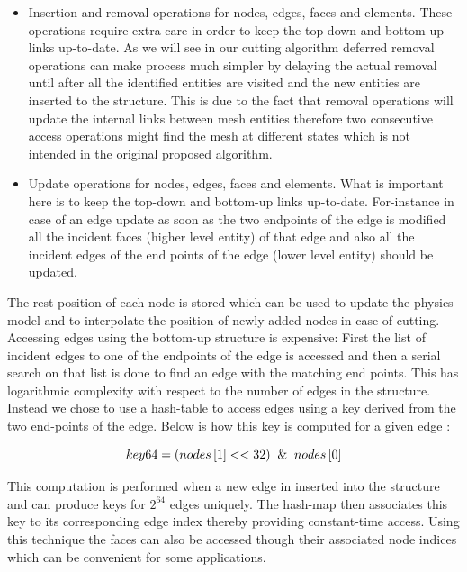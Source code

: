 \begin{itemize}
 \item Insertion and removal operations for nodes, edges, faces and elements. These operations require extra care in order to keep
 the top-down and bottom-up links up-to-date. As we will see in our cutting algorithm deferred removal operations can make process much simpler by
 delaying the actual removal until after all the identified entities are visited and the new entities are inserted to the structure.
 This is due to the fact that removal operations will update the internal links between mesh entities therefore two consecutive access operations
 might find the mesh at different states which is not intended in the original proposed algorithm.
 
 \item Update operations for nodes, edges, faces and elements. What is important here is to keep the top-down and bottom-up links up-to-date. 
 For-instance in case of an edge update as soon as the two endpoints of the edge is modified all the incident faces (higher level entity) 
 of that edge and also all the incident edges of the end points of the edge (lower level entity) should be updated.
\end{itemize}

The rest position of each node is stored which can be used to update the physics model and to interpolate the position 
of newly added nodes in case of cutting. Accessing edges using the bottom-up structure is expensive: First the list of incident 
edges to one of the endpoints of the edge is accessed and then a serial search on that list is done to find an edge with the matching 
end points. This has logarithmic complexity with respect to the number of edges in the structure. Instead we chose to use a hash-table
to access edges using a key derived from the two end-points of the edge. Below is how this key is computed for a given edge 
\cite{Mario2010PolygonMesh, Bloomenthal1997}:

\begin{equation}
 key64 = (nodes\left[ 1 \right] << 32) \And nodes\left[ 0 \right]
\end{equation}

This computation is performed when a new edge in inserted into the structure and can produce keys for $2^{64}$ edges uniquely. 
The hash-map then associates this key to its corresponding edge index thereby providing constant-time access. 
Using this technique the faces can also be accessed though their associated node indices which can be convenient for some applications. 

